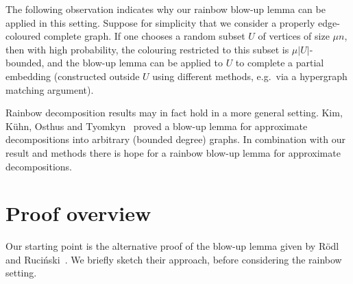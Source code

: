 \documentclass[10pt]{amsart}
\theoremstyle{definition}
\theoremstyle{claimstyle}
\theoremstyle{stepstyle}
\numberwithin{equation}{section}
\begin{document}
The following observation indicates why our rainbow blow-up lemma can be applied in this setting.
Suppose for simplicity that we consider a properly edge-coloured complete graph.
If one chooses a random subset $U$ of vertices of size $\mu n$, then with high probability, the colouring restricted to this subset is $\mu |U|$-bounded, and the blow-up lemma can be applied to $U$ to complete a partial embedding (constructed outside $U$ using different methods, e.g.~via a hypergraph matching argument).



Rainbow decomposition results may in fact hold in a more general setting.
Kim, K\"uhn, Osthus and Tyomkyn~\cite{KKOT:ta} proved a blow-up lemma for approximate decompositions into arbitrary (bounded degree) graphs. 
In combination with our result and methods there is hope for a rainbow blow-up lemma for approximate decompositions.






\section{Proof overview} \label{sec:sketch}

Our starting point is the alternative proof of the blow-up lemma given by R\"odl and Ruci\'nski~\cite{RR:99}. We briefly sketch their approach, before considering the rainbow setting.
\end{document}
